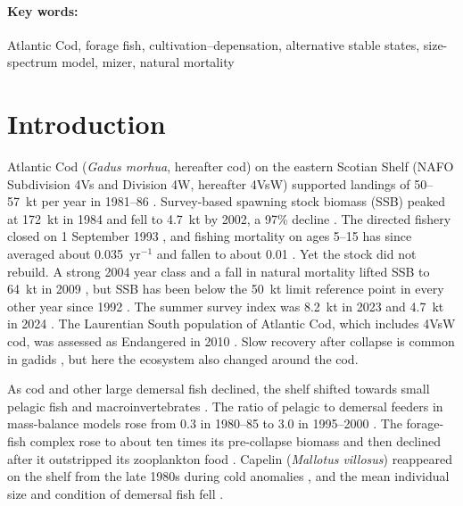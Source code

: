 \documentclass[12pt,letterpaper,fleqn]{article}
\newcommand{\yr}{yr$^{-1}$}
\begin{document}
\paragraph{Key words:} Atlantic Cod, forage fish, cultivation--depensation, alternative stable states, size-spectrum model, mizer, natural mortality

\section{Introduction}

Atlantic Cod (\textit{Gadus morhua}, hereafter cod) on the eastern Scotian Shelf (NAFO Subdivision 4Vs and Division 4W, hereafter 4VsW) supported landings of 50--57~kt per year in 1981--86 \autocite{fanning2003assessment}. Survey-based spawning stock biomass (SSB) peaked at 172~kt in 1984 and fell to 4.7~kt by 2002, a 97\% decline \autocite{fanning2003assessment}. The directed fishery closed on 1 September 1993 \autocite{mohn1994assessment}, and fishing mortality on ages 5--15 has since averaged about 0.035~\yr{} and fallen to about 0.01 \autocite{mohn2012laurentian}. Yet the stock did not rebuild. A strong 2004 year class and a fall in natural mortality lifted SSB to 64~kt in 2009 \autocite{swain2012forage,mohn2012laurentian}, but SSB has been below the 50~kt limit reference point in every other year since 1992 \autocite{dfo2011rpa}. The summer survey index was 8.2~kt in 2023 and 4.7~kt in 2024 \autocite{dfo2025rvtrends}. The Laurentian South population of Atlantic Cod, which includes 4VsW cod, was assessed as Endangered in 2010 \autocite{cosewic2010cod}. Slow recovery after collapse is common in gadids \autocite{hutchings2000collapse}, but here the ecosystem also changed around the cod.

As cod and other large demersal fish declined, the shelf shifted towards small pelagic fish and macroinvertebrates \autocite{choi2004transition,frank2005trophic}. The ratio of pelagic to demersal feeders in mass-balance models rose from 0.3 in 1980--85 to 3.0 in 1995--2000 \autocite{bundy2005structure}. The forage-fish complex rose to about ten times its pre-collapse biomass and then declined after it outstripped its zooplankton food \autocite{frank2011transient}. Capelin (\textit{Mallotus villosus}) reappeared on the shelf from the late 1980s during cold anomalies \autocite{frank1996recent}, and the mean individual size and condition of demersal fish fell \autocite{zwanenburg2000effects,choi2004transition}.
\end{document}

